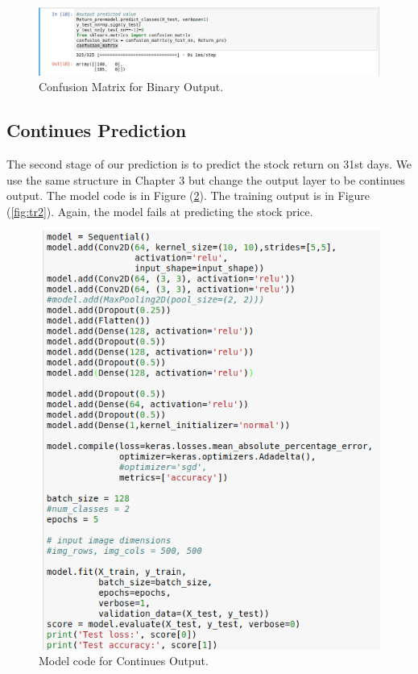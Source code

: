 \documentclass[12pt]{article}
\begin{document}
\begin{figure}[h]
	\centering
	\includegraphics[scale=0.7]{confusionM}
	\caption{Confusion Matrix for Binary Output.}
	\label{fig:cm}
\end{figure}


\subsection{Continues Prediction}
The second stage of our prediction is to predict the stock return on 31st days. We use the same structure in Chapter 3 but change the output layer to be continues output. The model code is in Figure (\ref{fig:m2}). The training output is in Figure (\ref{fig:tr2}). Again, the model fails at predicting the stock price.

\begin{figure}[h]
	\centering
	\includegraphics[scale=0.6]{model2}
	\caption{Model code for Continues Output.}
	\label{fig:m2}
\end{figure}
\end{document}

